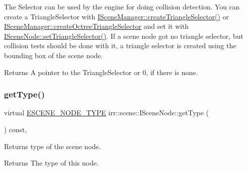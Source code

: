 The Selector can be used by the engine for doing collision detection. You can create a Triangle\+Selector with \hyperlink{classirr_1_1scene_1_1ISceneManager_a266625379b1558e9be1dc062ea4e71f7}{I\+Scene\+Manager\+::create\+Triangle\+Selector()} or \hyperlink{classirr_1_1scene_1_1ISceneManager_a4ed7d3b34f4d0c70395b6d464fe32b96}{I\+Scene\+Manager\+::create\+Octree\+Triangle\+Selector} and set it with \hyperlink{classirr_1_1scene_1_1ISceneNode_a87fb52ec54bf3ae117340d8defd1255f}{I\+Scene\+Node\+::set\+Triangle\+Selector()}. If a scene node got no triangle selector, but collision tests should be done with it, a triangle selector is created using the bounding box of the scene node. \begin{DoxyReturn}{Returns}
A pointer to the Triangle\+Selector or 0, if there is none. 
\end{DoxyReturn}
\mbox{\label{classirr_1_1scene_1_1ISceneNode_a3468b09e4afa009d2036efbea9c09b8c}} 
\subsubsection{\texorpdfstring{get\+Type()}{getType()}\hspace{0.1cm}{\footnotesize\ttfamily [1/2]}}
{\footnotesize\ttfamily virtual \hyperlink{namespaceirr_1_1scene_acad3d7ef92a9807d391ba29120f3b7bd}{E\+S\+C\+E\+N\+E\+\_\+\+N\+O\+D\+E\+\_\+\+T\+Y\+PE} irr\+::scene\+::\+I\+Scene\+Node\+::get\+Type (\begin{DoxyParamCaption}{ }\end{DoxyParamCaption}) const\hspace{0.3cm}{\ttfamily [inline]}, {\ttfamily [virtual]}}



Returns type of the scene node. 

\begin{DoxyReturn}{Returns}
The type of this node. 
\end{DoxyReturn}
\mbox{\label{classirr_1_1scene_1_1ISceneNode_a3468b09e4afa009d2036efbea9c09b8c}} 
